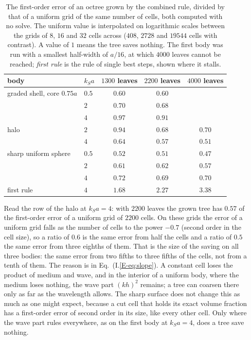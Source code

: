 \documentclass[11pt,a4paper]{article}
\begin{document}
\begin{table}[htbp]
\centering
\caption{The first-order error of an octree grown by the combined rule, divided by that of a uniform grid
of the same number of cells, both computed with no solve. The uniform value is interpolated on
logarithmic scales between the grids of $8$, $16$ and $32$ cells across ($408$, $2728$ and $19544$ cells
with contrast). A value of $1$ means the tree saves nothing. The first body was run with a smallest
half-width of $a/16$, at which $4000$ leaves cannot be reached; \emph{first rule} is the rule of single best steps,
shown where it stalls.}\label{tab:greedybodies}
\small
\begin{tabular}{@{}llccc@{}}
\toprule
body & $k_Sa$ & $1300$ leaves & $2200$ leaves & $4000$ leaves \\
\midrule
graded shell, core $0.75a$ & $0.5$ & $0.60$ & $0.60$ & \\
                           & $2$   & $0.70$ & $0.68$ & \\
                           & $4$   & $0.97$ & $0.91$ & \\
\midrule
halo                       & $2$   & $0.94$ & $0.68$ & $0.70$ \\
                           & $4$   & $0.64$ & $0.57$ & $0.51$ \\
\midrule
sharp uniform sphere       & $0.5$ & $0.52$ & $0.51$ & $0.47$ \\
                           & $2$   & $0.61$ & $0.62$ & $0.57$ \\
                           & $4$   & $0.72$ & $0.69$ & $0.70$ \\
\quad first rule           & $4$   & $1.68$ & $2.27$ & $3.38$ \\
\bottomrule
\end{tabular}
\end{table}

Read the row of the halo at $k_Sa=4$: with $2200$ leaves the grown tree has $0.57$ of the first-order
error of a uniform grid of $2200$ cells. On these grids the error of a uniform grid falls as the number of
cells to the power $-0.7$ (second order in the cell size), so a ratio of $0.6$ is the same error from half
the cells and a ratio of $0.5$ the same error from three eighths of them. That is the size of the saving
on all three bodies: the same error from two fifths to three fifths of the cells, not from a tenth of
them. The reason is in
Eq.~(I.\ref{E-eq:slope}). A constant cell loses the product of medium and wave, and in the interior of a
uniform body, where the medium loses nothing, the wave part $(kh)^2$ remains; a tree can coarsen there
only as far as the wavelength allows. The sharp surface does not change this as much as one might expect,
because a cut cell that holds its exact volume fraction has a first-order error of second order in its
size, like every other cell. Only where the wave part rules everywhere, as on the first body at $k_Sa=4$,
does a tree save nothing.
\end{document}

